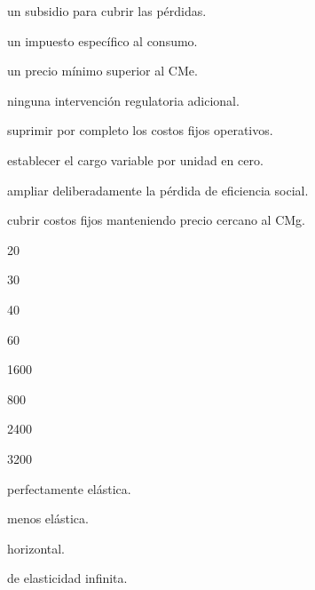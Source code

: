 \begin{opts}
    \item un subsidio para cubrir las pérdidas.
    \item un impuesto específico al consumo.
    \item un precio mínimo superior al CMe.
    \item ninguna intervención regulatoria adicional.
\end{opts}

\begin{opts}
    \item suprimir por completo los costos fijos operativos.
    \item establecer el cargo variable por unidad en cero.
    \item ampliar deliberadamente la pérdida de eficiencia social.
    \item cubrir costos fijos manteniendo precio cercano al CMg.
\end{opts}

\begin{opts}
    \item 20
    \item 30
    \item 40
    \item 60
\end{opts}

\begin{opts}
    \item 1600
    \item 800
    \item 2400
    \item 3200
\end{opts}

\begin{opts}
    \item perfectamente elástica.
    \item menos elástica.
    \item horizontal.
    \item de elasticidad infinita.
\end{opts}
